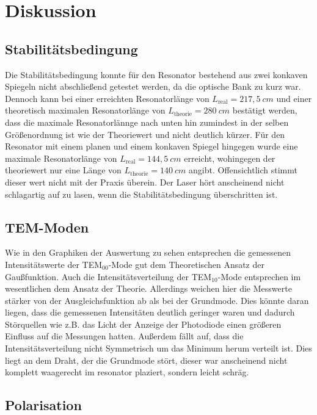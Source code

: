 \section{Diskussion}
\label{sec:Diskussion}

\subsection{Stabilitätsbedingung}

Die Stabilitätsbedingung konnte für den Resonator bestehend aus zwei konkaven Spiegeln nicht abschließend getestet werden, 
da die optische Bank zu kurz war. Dennoch kann bei einer erreichten Resonatorlänge von $L_{\text{real}} = 217,5 \: cm$ und einer 
theoretisch maximalen Resonatorlänge von $L_{\text{theorie}} = 280 \: cm$ bestätigt werden, dass die maximale Resonatorlännge 
nach unten hin zumindest in der selben Größenordnung ist wie der Theoriewert und nicht deutlich kürzer.
Für den Resonator mit einem planen und einem konkaven Spiegel hingegen wurde eine maximale Resonatorlänge von $L_{\text{real}} = 144,5 \: cm$
erreicht, wohingegen der theoriewert nur eine Länge von $L_{\text{theorie}} = 140 \: cm$ angibt.
Offensichtlich stimmt dieser wert nicht mit der Praxis überein. Der Laser hört anscheinend nicht schlagartig auf zu lasen, 
wenn die Stabilitätsbedingung überschritten ist.


\subsection{TEM-Moden}

Wie in den Graphiken der Auswertung zu sehen entsprechen die gemessenen Intensitätswerte der TEM$_{00}$-Mode gut dem Theoretischen 
Ansatz der Gaußfunktion. 
Auch die Intensitätsverteilung der TEM$_{10}$-Mode entsprechen im wesentlichen dem Ansatz der Theorie.
Allerdings weichen hier die Messwerte stärker von der Ausgleichsfunktion ab als bei der Grundmode. 
Dies könnte daran liegen, dass die gemessenen Intensitäten deutlich geringer waren und dadurch Störquellen wie z.B. das Licht 
der Anzeige der Photodiode einen größeren Einfluss auf die Messungen hatten.
Außerdem fällt auf, dass die Intensitätsverteilung nicht Symmetrisch um das Minimum herum verteilt ist. 
Dies liegt an dem Draht, der die Grundmode stört, dieser war anscheinend nicht komplett waagerecht im resonator plaziert, sondern leicht schräg.


\subsection{Polarisation}

